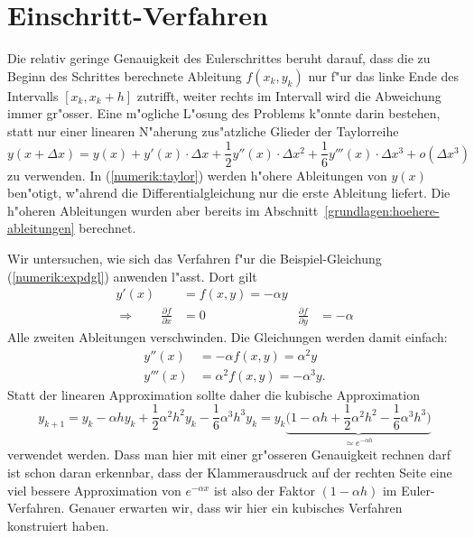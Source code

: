 \section{Einschritt-Verfahren\label{section:numerik:einschritt}}
Die relativ geringe Genauigkeit des Eulerschrittes beruht darauf,
dass die zu Beginn des Schrittes berechnete Ableitung $f(x_k,y_k)$
nur f"ur das linke Ende des Intervalls $[x_k, x_k+h]$ zutrifft,
weiter rechts im Intervall wird die Abweichung immer gr"osser.
Eine m"ogliche L"osung des Problems k"onnte darin bestehen, statt
nur einer linearen N"aherung zus"atzliche Glieder der Taylorreihe
\begin{equation}
y(x+\Delta x)
=
y(x)
+
y'(x)\cdot \Delta x
+
\frac12 y''(x)\cdot \Delta x^2
+
\frac16 y'''(x)\cdot \Delta x^3
+
o(\Delta x^3)
\label{numerik:taylor}
\end{equation}
zu verwenden.
In (\ref{numerik:taylor}) werden h"ohere Ableitungen von $y(x)$ ben"otigt,
w"ahrend die Differentialgleichung nur die erste Ableitung liefert.
Die h"oheren Ableitungen wurden aber bereits im
Abschnitt~\ref{grundlagen:hoehere-ableitungen} berechnet.

Wir untersuchen, wie sich das Verfahren f"ur die Beispiel-Gleichung
(\ref{numerik:expdgl}) anwenden l"asst.
Dort gilt
\begin{equation*}
\begin{aligned}
y'(x)&=f(x,y)=-\alpha y
\\
\Rightarrow\qquad
\frac{\partial f}{\partial x}&=0&\frac{\partial f}{\partial y}&=-\alpha
\end{aligned}
\end{equation*}
Alle zweiten Ableitungen verschwinden.
Die Gleichungen werden damit einfach:
\begin{align*}
y''(x)&=-\alpha f(x,y)=\alpha^2 y
\\
y'''(x)&=\alpha^2f(x,y)=-\alpha^3 y.
\end{align*}
Statt der linearen Approximation sollte daher die kubische Approximation
\begin{equation}
y_{k+1}
=
y_{k}-\alpha h y_k +\frac12\alpha^2 h^2 y_k -\frac16 \alpha^3h^3 y_k
=
y_{k}\underbrace{\biggl(1-\alpha h +\frac12\alpha^2h^2 -\frac16 \alpha^3h^3\biggr)}_{\simeq e^{-\alpha h}}
\label{numerik:kubisch}
\end{equation}
verwendet werden.
Dass man hier mit einer gr"osseren Genauigkeit rechnen darf ist schon daran
erkennbar, dass der Klammerausdruck auf der rechten Seite eine viel
bessere Approximation von $e^{-\alpha x}$ ist also der Faktor
$(1-\alpha h)$ im Euler-Verfahren.
Genauer erwarten wir, dass wir hier ein kubisches Verfahren konstruiert haben.

